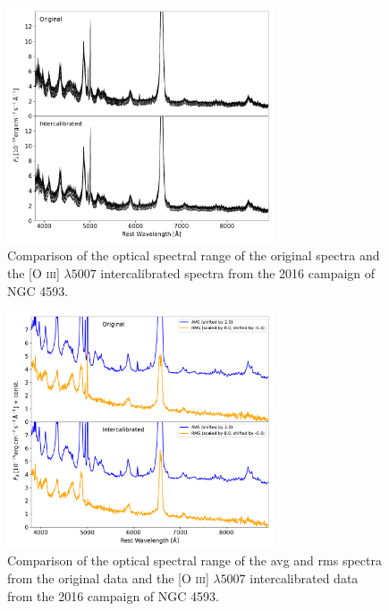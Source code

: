\newpage
\begin{figure}[!ht]
	\centering
	\includegraphics[width=0.7\textwidth]{pictures/Chapter3/comparison_spectra}
	\caption{Comparison of the optical spectral range of the original spectra and the [O \textsc{iii}] $\lambda5007$ intercalibrated spectra from the 2016 campaign of NGC 4593.}
	\label{fig:comparison_spectra}
\end{figure}




\begin{figure}[!ht]
	\centering
	\includegraphics[width=0.7\textwidth]{pictures/Chapter3/comparison_avg_rms}
	\caption{Comparison of the optical spectral range of the avg and rms spectra from the original data and the [O \textsc{iii}] $\lambda5007$ intercalibrated data from the 2016 campaign of NGC 4593.}
	\label{fig:comparison_spectra_avg_rms}
\end{figure}



